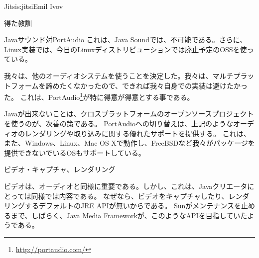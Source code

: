 \begin{aosachapter}{Jitsi}{s:jitsi}{Emil Ivov}
\begin{aosasect1}{得た教訓}
\begin{aosasect2}{Javaサウンド対PortAudio}
これは、Java Soundでは、不可能である。さらに、Linux実装では、今日のLinuxディストリビューションでは廃止予定のOSSを使っている。

我々は、他のオーディオシステムを使うことを決定した。我々は、マルチプラットフォームを諦めたくなかったので、できれば我々自身での実装は避けたかった。
これは、PortAudio\footnote{\url{http://portaudio.com/}}が特に得意が得意とする事である。

Javaが出来ないことは、クロスプラットフォームのオープンソースプロジェクトを使うのが、次善の策である。
PortAudioへの切り替えは、上記のようなオーディオのレンダリングや取り込みに関する優れたサポートを提供する。
これは、また、Windows、Linux、Mac OS Xで動作し、FreeBSDなど我々がパッケージを提供できないでいるOSもサポートしている。

\end{aosasect2}

\begin{aosasect2}{ビデオ・キャプチャ、レンダリング}

ビデオは、オーディオと同様に重要である。しかし、これは、Javaクリエータにとっては同様では内容である。
なぜなら、ビデオをキャプチャしたり、レンダリングするデフォルトのJRE APIが無いからである。
Sunがメンテナンスを止めるまで、しばらく、Java Media Frameworkが、このようなAPIを目指していたようである。


\end{aosasect2}
\end{aosasect1}
\end{aosachapter}
